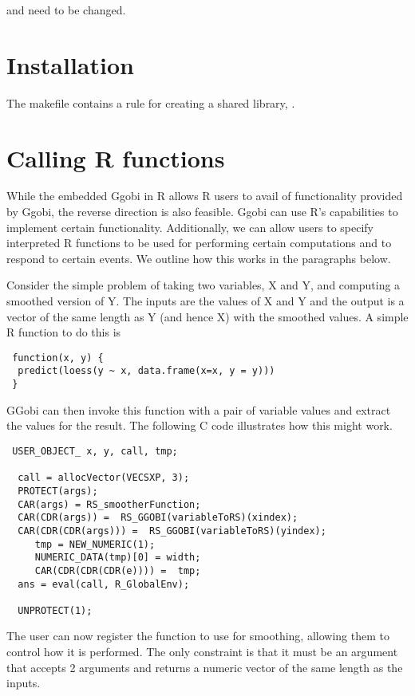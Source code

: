 \documentclass{article}
\def\SharedLibrary#1{\textsl{\textbf{\Escape{#1}}}}
\begin{document}
 and  need to be changed.


\section{Installation}
The makefile contains a rule for creating a shared library,
\SharedLibrary{libGGobi.so}.


\section{Calling R functions}
While the embedded Ggobi in R allows R users to avail of functionality
provided by Ggobi, the reverse direction is also feasible.  Ggobi can
use R's capabilities to implement certain functionality. Additionally,
we can allow users to specify interpreted R functions to be used for
performing certain computations and to respond to certain events.
We outline how this works in the paragraphs below.

Consider the simple problem of taking two variables, X and Y, and
computing a smoothed version of Y.  The inputs are the values of X and
Y and the output is a vector of the same length as Y (and hence X)
with the smoothed values.
A simple R function to do this is
\begin{verbatim}
 function(x, y) {
  predict(loess(y ~ x, data.frame(x=x, y = y)))
 }
\end{verbatim}

GGobi can then invoke this function with a pair of variable values and
extract the values for the result.
The following C code illustrates how this might work.
\begin{verbatim}
 USER_OBJECT_ x, y, call, tmp;

  call = allocVector(VECSXP, 3);
  PROTECT(args);
  CAR(args) = RS_smootherFunction;
  CAR(CDR(args)) =  RS_GGOBI(variableToRS)(xindex);
  CAR(CDR(CDR(args))) =  RS_GGOBI(variableToRS)(yindex);
     tmp = NEW_NUMERIC(1);
     NUMERIC_DATA(tmp)[0] = width;
     CAR(CDR(CDR(CDR(e)))) =  tmp;
  ans = eval(call, R_GlobalEnv);

  UNPROTECT(1);
\end{verbatim}

The user can now register the function to use for smoothing, allowing
them to control how it is performed. The only constraint is that it
must be an argument that accepts 2 arguments and returns a numeric
vector of the same length as the inputs.
\end{document}
